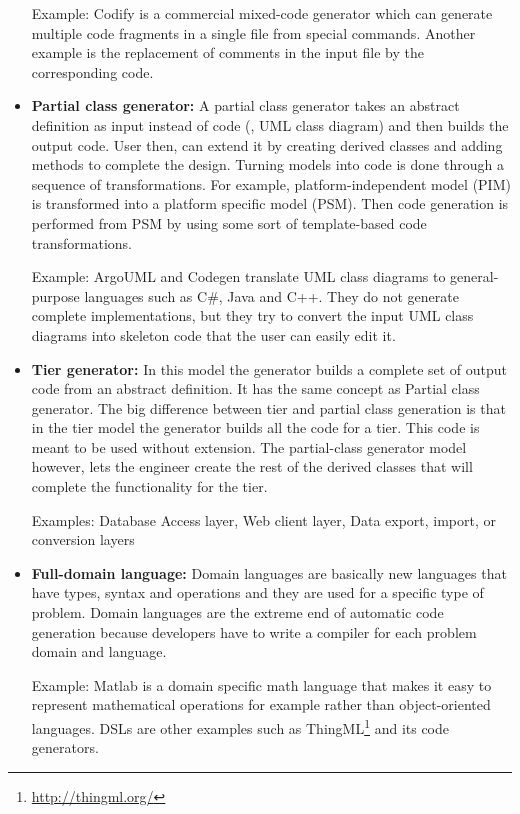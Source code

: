 \begin{itemize}
Example: Codify is a commercial mixed-code generator which can generate multiple code fragments in a single file from special commands. Another example is the replacement of comments in the input file by the corresponding code.

\item \textbf{Partial class generator:} A partial class generator takes an abstract definition as input instead of code (\eg, UML class diagram) and then builds the output code. User then, can extend it by creating derived classes and adding methods to complete the design. Turning models into code is done through a sequence of transformations. For example, platform-independent model (PIM) is transformed into a platform specific model (PSM). Then code generation is performed from PSM by using some sort of template-based code transformations.

Example: ArgoUML and Codegen translate UML class diagrams to general-purpose languages such as C\#, Java and C++. They do not generate complete implementations, but they try to convert the input UML class diagrams into skeleton code that the user can easily edit it. 

\item \textbf{Tier generator:} In this model the generator builds a complete set of output code from an abstract definition. It has the same concept as Partial class generator. The big difference between tier and partial class generation is that in the tier model the generator builds all the code for a tier. This code is meant to be used without extension. The partial-class generator model however, lets the engineer create the rest of the derived classes that will complete the functionality for the tier.

Examples: Database Access layer, Web client layer, Data export, import, or conversion layers

\item \textbf{Full-domain language:} Domain languages are basically new languages that have types, syntax and operations and they are used for a specific type of problem. 
Domain languages are the extreme end of automatic code generation because developers have to write a compiler for each problem domain and language. 

Example: Matlab is a domain specific math language that makes it easy to represent mathematical operations for example rather than object-oriented languages. DSLs are other examples such as ThingML\footnote{\url{http://thingml.org/}} and its code generators.

\end{itemize}
